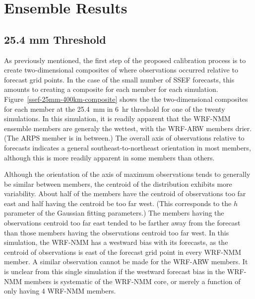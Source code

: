 

\section{Ensemble Results}
\label{eresults}




\subsection{25.4 mm Threshold}
\label{eresults_25.4mm}

As previously mentioned, the first step of the proposed calibration process is to create two-dimensional composites of where observations occurred relative to forecast grid points.
In the case of the small number of SSEF forecasts, this amounts to creating a composite for each member for each simulation.
\mbox{Figure \ref{ssef-25mm-400km-composite}} shows the the two-dimensional composites for each member at the \mbox{25.4 mm} in \mbox{6 hr} threshold for one of the twenty simulations.
In this simulation, it is readily apparent that the WRF-NMM ensemble members are generaly the wettest, with the WRF-ARW members drier.
(The ARPS member is in between.)
The overall axis of observations relative to forecasts indicates a general southeast-to-northeast orientation in most members, although this is more readily apparent in some members than others.


Although the orientation of the axis of maximum observations tends to generally be similar between members, the centroid of the distribution exhibits more variability.
About half of the members have the centroid of observations too far east and half having the centroid be too far west.
(This corresponds to the $h$ parameter of the Gaussian fitting parameters.)
The members having the observations centroid too far east tended to be farther away from the forecast than those members having the observations centroid too far west.
In this simulation, the WRF-NMM has a westward bias with its forecasts, as the centroid of observations is east of the forecast grid point in every WRF-NMM member.
A similar observation cannot be made for the WRF-ARW members.
It is unclear from this single simulation if the westward forecast bias in the WRF-NMM members is systematic of the WRF-NMM core, or merely a function of only having 4 WRF-NMM members.


